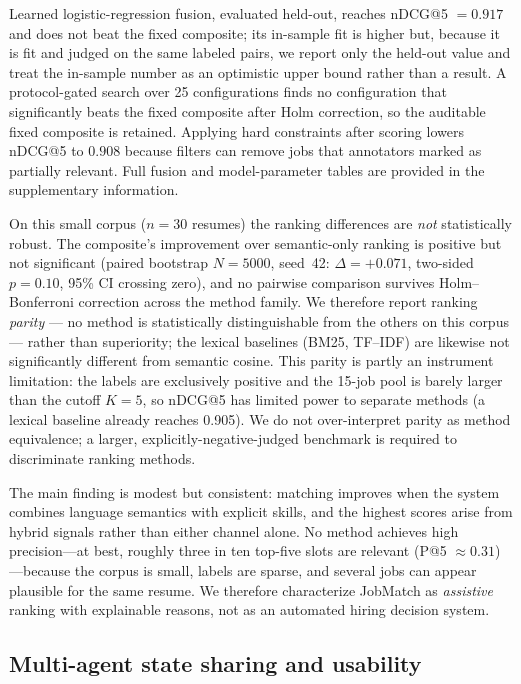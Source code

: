 Learned logistic-regression fusion, evaluated held-out, reaches nDCG@5 $= 0.917$ and does not beat the fixed composite; its in-sample fit is higher but, because it is fit and judged on the same labeled pairs, we report only the held-out value and treat the in-sample number as an optimistic upper bound rather than a result. A protocol-gated search over 25 configurations finds no configuration that significantly beats the fixed composite after Holm correction, so the auditable fixed composite is retained.
Applying hard constraints after scoring lowers nDCG@5 to $0.908$ because filters can remove jobs that annotators marked as partially relevant.
Full fusion and model-parameter tables are provided in the supplementary information.

On this small corpus ($n{=}30$ resumes) the ranking differences are \emph{not} statistically robust. The composite's improvement over semantic-only ranking is positive but not significant (paired bootstrap $N{=}5000$, seed~42: $\Delta{=}{+}0.071$, two-sided $p{=}0.10$, 95\% CI crossing zero), and no pairwise comparison survives Holm--Bonferroni correction across the method family. We therefore report ranking \emph{parity} --- no method is statistically distinguishable from the others on this corpus --- rather than superiority; the lexical baselines (BM25, TF--IDF) are likewise not significantly different from semantic cosine. This parity is partly an instrument limitation: the labels are exclusively positive and the 15-job pool is barely larger than the cutoff $K{=}5$, so nDCG@5 has limited power to separate methods (a lexical baseline already reaches 0.905). We do not over-interpret parity as method equivalence; a larger, explicitly-negative-judged benchmark is required to discriminate ranking methods.

The main finding is modest but consistent: matching improves when the system combines language semantics with explicit skills, and the highest scores arise from hybrid signals rather than either channel alone.
No method achieves high precision---at best, roughly three in ten top-five slots are relevant (P@5 $\approx 0.31$)---because the corpus is small, labels are sparse, and several jobs can appear plausible for the same resume.
We therefore characterize JobMatch as \emph{assistive} ranking with explainable reasons, not as an automated hiring decision system.

\subsection{Multi-agent state sharing and usability}\label{sec:6-agent-sharing}\label{sec:6-agentic}

